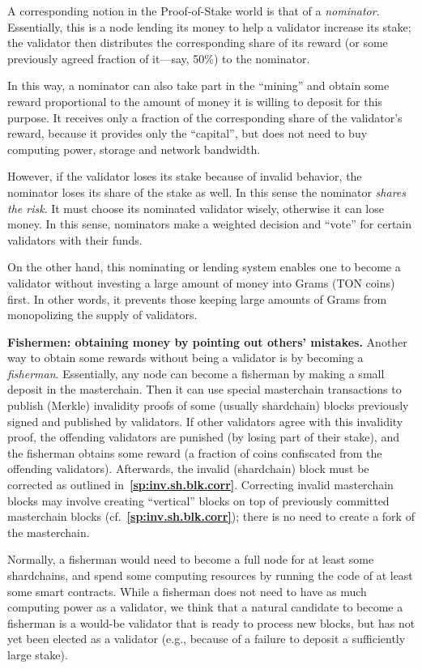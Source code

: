 \documentclass[12pt,oneside]{article}
\def\makepoint#1{\medbreak\noindent{\bf #1.\ }}
\def\nxsubpoint{\refstepcounter{subsubsection}%
  \smallbreak\makepoint{\thesubsubsection}}
\def\refpoint#1{{\rm\textbf{\ref{#1}}}}
\let\ptref=\refpoint
\def\embt(#1.){\textbf{#1.}}
\begin{document}
A corresponding notion in the Proof-of-Stake world is that of a {\em
  nominator}. Essentially, this is a node lending its money to help a
validator increase its stake; the validator then distributes the
corresponding share of its reward (or some previously agreed fraction
of it---say, 50\%) to the nominator.

In this way, a nominator can also take part in the ``mining'' and
obtain some reward proportional to the amount of money it is willing
to deposit for this purpose. It receives only a fraction of the
corresponding share of the validator's reward, because it provides
only the ``capital'', but does not need to buy computing power,
storage and network bandwidth.

However, if the validator loses its stake because of invalid behavior,
the nominator loses its share of the stake as well. In this sense the
nominator {\em shares the risk}. It must choose its nominated
validator wisely, otherwise it can lose money. In this sense,
nominators make a weighted decision and ``vote'' for certain
validators with their funds.

On the other hand, this nominating or lending system enables one to
become a validator without investing a large amount of money into
Grams (TON coins) first. In other words, it prevents those keeping
large amounts of Grams from monopolizing the supply of validators.

\nxsubpoint\label{sp:fish} \embt(Fishermen: obtaining money by
pointing out others' mistakes.)  Another way to obtain some rewards
without being a validator is by becoming a {\em
  fisherman}. Essentially, any node can become a fisherman by making a
small deposit in the masterchain. Then it can use special masterchain
transactions to publish (Merkle) invalidity proofs of some (usually
shardchain) blocks previously signed and published by validators. If
other validators agree with this invalidity proof, the offending
validators are punished (by losing part of their stake), and the
fisherman obtains some reward (a fraction of coins confiscated from
the offending validators). Afterwards, the invalid (shardchain) block
must be corrected as outlined
in~\ptref{sp:inv.sh.blk.corr}. Correcting invalid masterchain blocks
may involve creating ``vertical'' blocks on top of previously
committed masterchain blocks (cf.~\ptref{sp:inv.sh.blk.corr}); there
is no need to create a fork of the masterchain.

Normally, a fisherman would need to become a full node for at least
some shardchains, and spend some computing resources by running the
code of at least some smart contracts. While a fisherman does not need
to have as much computing power as a validator, we think that a
natural candidate to become a fisherman is a would-be validator that
is ready to process new blocks, but has not yet been elected as a
validator (e.g., because of a failure to deposit a sufficiently large
stake).
\end{document}
